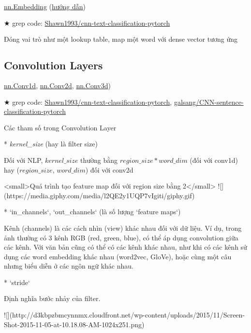 \href{http://pytorch.org/docs/master/nn.html#embedding}{nn.Embedding} (\href{http://pytorch.org/tutorials/beginner/nlp/word_embeddings_tutorial.html}{hướng dẫn})

★ grep code: \href{https://github.com/Shawn1993/cnn-text-classification-pytorch/blob/master/model.py#L18}{Shawn1993/cnn-text-classification-pytorch}

Đóng vai trò như một lookup table, map một word với dense vector tương ứng

\subsection{Convolution Layers}


\href{http://pytorch.org/docs/master/nn.html#conv1d}{nn.Conv1d}, \href{http://pytorch.org/docs/master/nn.html#conv2d}{nn.Conv2d}, \href{http://pytorch.org/docs/master/nn.html#conv3d}{nn.Conv3d})

★ grep code: \href{https://github.com/Shawn1993/cnn-text-classification-pytorch/blob/master/model.py#L20-L24}{Shawn1993/cnn-text-classification-pytorch}, \href{https://github.com/galsang/CNN-sentence-classification-pytorch/blob/master/model.py#L36-L38}{galsang/CNN-sentence-classification-pytorch}

Các tham số trong Convolution Layer

* \textit{kernel\_size} (hay là filter size)

Đối với NLP, $kernel\_size$ thường bằng $region\_size * word\_dim$ (đối với conv1d) hay ($region\_size$, $word\_dim$) đối với conv2d

<small>Quá trình tạo feature map đối với region size bằng 2</small>
![](https://media.giphy.com/media/l2QE2y1UQP7vIgiti/giphy.gif)

* `in_channels`, `out_channels` (là số lượng `feature maps`)

Kênh (channels) là các cách nhìn (view) khác nhau đối với dữ liệu. Ví dụ, trong ảnh thường có 3 kênh RGB (red, green, blue), có thể áp dụng convolution giữa các kênh. Với văn bản cũng có thể có các kênh khác nhau, như khi có các kênh sử dụng các word embedding khác nhau (word2vec, GloVe), hoặc cùng một câu nhưng biểu diễn ở các ngôn ngữ khác nhau.

* `stride`

Định nghĩa bước nhảy của filter.

![](http://d3kbpzbmcynnmx.cloudfront.net/wp-content/uploads/2015/11/Screen-Shot-2015-11-05-at-10.18.08-AM-1024x251.png)

